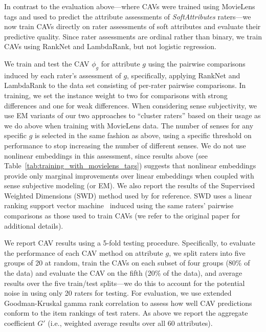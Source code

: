 \documentclass[manuscript,screen,nonacm]{acmart}
\newcommand{\1}{{\mathbf 1}}
\theoremstyle{TheoremNum}
\begin{document}
In contrast to the evaluation above---where CAVs were trained using MovieLens tags and used to predict the attribute assessments of \emph{SoftAttributes} raters---we now train CAVs directly on rater assessments of soft attributes and evaluate their predictive quality. Since rater assessments are ordinal rather than binary, we train CAVs using RankNet and LambdaRank, but not logistic regression.


We train and test the CAV $\phi_g$ for attribute $g$ using the pairwise comparisons induced by each rater's assessment of $g$, specifically, applying RankNet and LambdaRank to the data set consisting of per-rater pairwise comparisons. In training, we set the instance weight to two for comparisons with strong differences and one for weak differences.
When considering sense subjectivity, we use EM variants of our two approaches to ``cluster raters'' based on their usage as we do above when training with MovieLens data. The number of senses for any specific $g$ is selected in the same fashion as above, using a specific threshold on performance to stop increasing the number of different senses.
We do not use nonlinear embeddings in this assessment, since results above (see Table~\ref{tab:training_with_movielens_tags}) suggests that nonlinear embeddings provide only marginal improvements over linear embeddings when coupled with sense subjective modeling (or EM). We also report the results of the Supervised Weighted Dimensions (SWD) method used by \citet{sigir21:filipandkristian} for reference. SWD uses a linear ranking support vector machine~\cite{joachims02} induced using the same raters' pairwise comparisons as those used to train CAVs (we refer to the original paper for additional details).

We report CAV results using a 5-fold testing procedure. Specifically, to evaluate the performance of each CAV method on attribute $g$, we split raters into five groups of 20 at random, train the CAVs on each subset of four groups (80\% of the data) and evaluate the CAV on the fifth (20\% of the data), and average results over the five train/test splits---we do this to account for the potential noise in using only 20 raters for testing. For evaluation, we use extended Goodman-Kruskal gamma rank correlation to assess how well CAV predictions conform to the item rankings of test raters. As above we report the aggregate  coefficient $G'$ (i.e., weighted average results over all 60 attributes).
\end{document}
